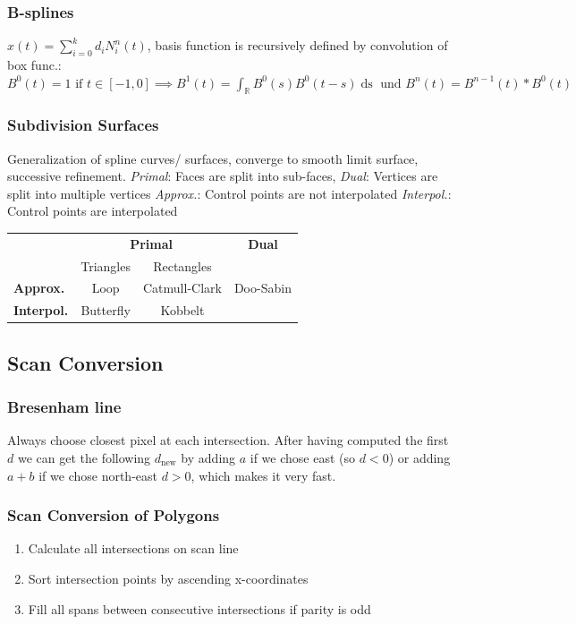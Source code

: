 \documentclass[a4paper,10pt]{article}
\renewcommand*{\arraystretch}{2}
\begin{document}
\subsubsection{B-splines}
\( x(t) = \sum_{i=0}^k d_i N_i^n (t) \), basis function is recursively defined by convolution of box func.: 
\( B^0(t) = 1 \text{ if } t \in [-1, 0] \implies B^1(t) = \int_\mathbb{R} B^0(s) B^0(t-s) \mathop{ds} \text{ und } B^n(t) = B^{n-1}(t) * B^0(t)\)


\subsubsection{Subdivision Surfaces} Generalization of spline curves/ surfaces, converge to smooth limit surface, successive refinement.
\textit{Primal}: Faces are split into sub-faces,
\textit{Dual}: Vertices are split into multiple vertices
\textit{Approx.}: Control points are not interpolated
\textit{Interpol.}: Control points are interpolated

\begin{center}
    \renewcommand{\arraystretch}{1.2}
\begin{tabularx}{\linewidth}{Xccc}
    \toprule
    & \multicolumn{2}{c}{\textbf{Primal}} & \textbf{Dual} \\
    & Triangles & Rectangles & \\
    \midrule
    \textbf{Approx.} & Loop & Catmull-Clark & Doo-Sabin \\
    \textbf{Interpol.} & Butterfly & Kobbelt & \\
    \bottomrule
\end{tabularx}
\end{center}

\subsection{Scan Conversion}
\subsubsection{Bresenham line} Always choose closest pixel at each intersection. 
After having computed the first \( d \) we can get the following \( d_\text{new} \) by adding \( a \) if we chose east (so \( d < 0 \)) or adding \( a + b \) if we chose north-east \( d > 0 \), which makes it very fast.

\subsubsection{Scan Conversion of Polygons} 
\begin{enumerate}
    \item Calculate all intersections on scan line
    \item Sort intersection points by ascending x-coordinates
    \item Fill all spans between consecutive intersections if parity is odd
\end{enumerate}
\end{document}
